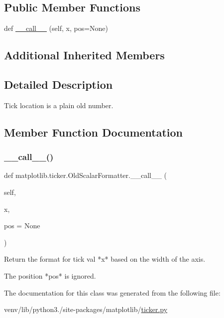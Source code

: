 \subsection*{Public Member Functions}
\begin{DoxyCompactItemize}
\item 
def \hyperlink{classmatplotlib_1_1ticker_1_1OldScalarFormatter_a9aacc33108c3ff831c38790d2a23601e}{\+\_\+\+\_\+call\+\_\+\+\_\+} (self, x, pos=None)
\end{DoxyCompactItemize}
\subsection*{Additional Inherited Members}


\subsection{Detailed Description}
\begin{DoxyVerb}Tick location is a plain old number.
\end{DoxyVerb}
 

\subsection{Member Function Documentation}
\mbox{\label{classmatplotlib_1_1ticker_1_1OldScalarFormatter_a9aacc33108c3ff831c38790d2a23601e}} 
\subsubsection{\texorpdfstring{\+\_\+\+\_\+call\+\_\+\+\_\+()}{\_\_call\_\_()}}
{\footnotesize\ttfamily def matplotlib.\+ticker.\+Old\+Scalar\+Formatter.\+\_\+\+\_\+call\+\_\+\+\_\+ (\begin{DoxyParamCaption}\item[{}]{self,  }\item[{}]{x,  }\item[{}]{pos = {\ttfamily None} }\end{DoxyParamCaption})}

\begin{DoxyVerb}Return the format for tick val *x* based on the width of the axis.

The position *pos* is ignored.
\end{DoxyVerb}
 

The documentation for this class was generated from the following file\+:\begin{DoxyCompactItemize}
\item 
venv/lib/python3./site-\/packages/matplotlib/\hyperlink{ticker_8py}{ticker.\+py}\end{DoxyCompactItemize}
